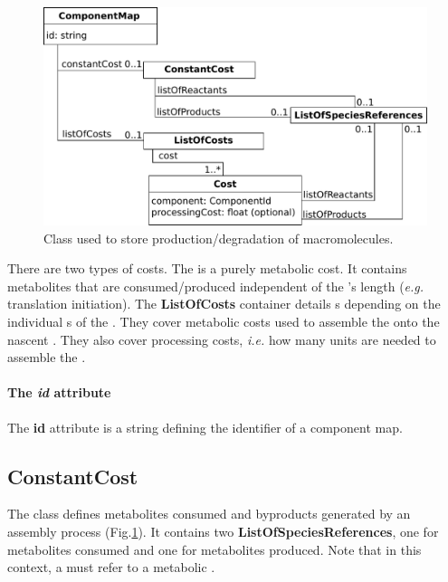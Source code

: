 \begin{figure}
  \centering
  \includegraphics[scale=0.8]{figures/processes_component_map}
  \caption{Class used to store production/degradation of macromolecules.}
\label{fig:processes_component_map}
\end{figure}

There are two types of costs.
The \constantcost{} is a purely metabolic cost.
It contains metabolites that are consumed/produced independent of the
\macromolecule{}'s length (\textit{e.g.} translation initiation).
The \textbf{ListOfCosts} container details \cost{}s depending on the individual
\component{}s of the \macromolecule{}.
They cover metabolic costs used to assemble the \component{} onto the nascent
\macromolecule{}.
They also cover processing costs, \textit{i.e.} how many \machinery{} units
are needed to assemble the \component{}.

\paragraph{The \textit{id} attribute}
The \textbf{id} attribute is a string defining the identifier of a
component map.


\subsection{ConstantCost}
\label{sec:constant_cost}

The \constantcost{} class defines metabolites consumed and byproducts
generated by an assembly process (Fig.\ref{fig:processes_component_map}).
It contains two \textbf{ListOfSpeciesReferences}, one for metabolites
consumed and one for metabolites produced.
Note that in this context, a \speciesreference{} must refer to a
metabolic \species.


